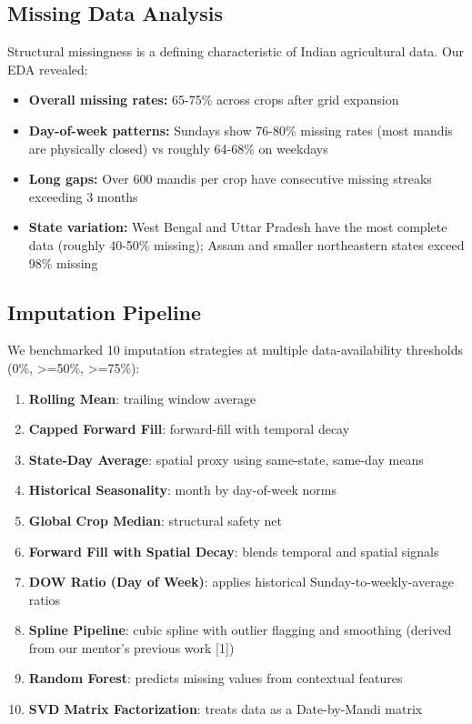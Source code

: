 \documentclass[conference]{IEEEtran}
\begin{document}
\subsection{Missing Data Analysis}

Structural missingness is a defining characteristic of Indian agricultural data. Our EDA revealed:

\begin{itemize}
\item \textbf{Overall missing rates:} 65-75\% across crops after grid expansion
\item \textbf{Day-of-week patterns:} Sundays show 76-80\% missing rates (most mandis are physically closed) vs roughly 64-68\% on weekdays
\item \textbf{Long gaps:} Over 600 mandis per crop have consecutive missing streaks exceeding 3 months
\item \textbf{State variation:} West Bengal and Uttar Pradesh have the most complete data (roughly 40-50\% missing); Assam and smaller northeastern states exceed 98\% missing
\end{itemize}

\subsection{Imputation Pipeline}

We benchmarked 10 imputation strategies at multiple data-availability thresholds (0\%, >=50\%, >=75\%):

\begin{enumerate}
\item \textbf{Rolling Mean}: trailing window average
\item \textbf{Capped Forward Fill}: forward-fill with temporal decay
\item \textbf{State-Day Average}: spatial proxy using same-state, same-day means
\item \textbf{Historical Seasonality}: month by day-of-week norms
\item \textbf{Global Crop Median}: structural safety net
\item \textbf{Forward Fill with Spatial Decay}: blends temporal and spatial signals
\item \textbf{DOW Ratio (Day of Week)}: applies historical Sunday-to-weekly-average ratios
\item \textbf{Spline Pipeline}: cubic spline with outlier flagging and smoothing (derived from our mentor's previous work [1])
\item \textbf{Random Forest}: predicts missing values from contextual features
\item \textbf{SVD Matrix Factorization}: treats data as a Date-by-Mandi matrix
\end{enumerate}
\end{document}
